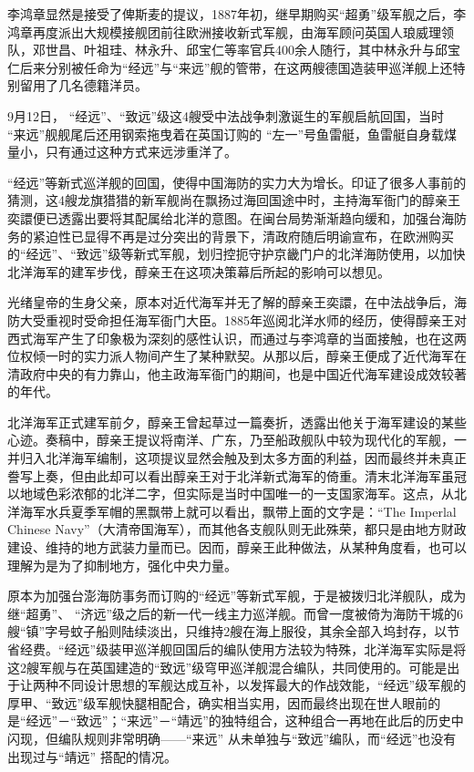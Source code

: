 \documentclass[12pt,UTF8]{ctexbook}
\begin{document}
李鸿章显然是接受了俾斯麦的提议，1887年初，继早期购买“超勇”级军舰之后，李鸿章再度派出大规模接舰团前往欧洲接收新式军舰，由海军顾问英国人琅威理领队，邓世昌、叶祖珪、林永升、邱宝仁等率官兵400余人随行，其中林永升与邱宝仁后来分别被任命为“经远”与“来远”舰的管带，在这两艘德国造装甲巡洋舰上还特别留用了几名德籍洋员。

9月12日， “经远”、“致远”级这4艘受中法战争刺激诞生的军舰启航回国，当时 “来远”舰舰尾后还用钢索拖曳着在英国订购的 “左一”号鱼雷艇，鱼雷艇自身载煤量小，只有通过这种方式来远涉重洋了。

“经远”等新式巡洋舰的回国，使得中国海防的实力大为增长。印证了很多人事前的猜测，这4艘龙旗猎猎的新军舰尚在飘扬过海回国途中时，主持海军衙门的醇亲王奕譞便已透露出要将其配属给北洋的意图。在闽台局势渐渐趋向缓和，加强台海防务的紧迫性已显得不再是过分突出的背景下，清政府随后明谕宣布，在欧洲购买的“经远”、“致远”级等新式军舰，划归控扼守护京畿门户的北洋海防使用，以加快北洋海军的建军步伐，醇亲王在这项决策幕后所起的影响可以想见。

光绪皇帝的生身父亲，原本对近代海军并无了解的醇亲王奕譞，在中法战争后，海防大受重视时受命担任海军衙门大臣。1885年巡阅北洋水师的经历，使得醇亲王对西式海军产生了印象极为深刻的感性认识，而通过与李鸿章的当面接触，也在这两位权倾一时的实力派人物间产生了某种默契。从那以后，醇亲王便成了近代海军在清政府中央的有力靠山，他主政海军衙门的期间，也是中国近代海军建设成效较著的年代。

北洋海军正式建军前夕，醇亲王曾起草过一篇奏折，透露出他关于海军建设的某些心迹。奏稿中，醇亲王提议将南洋、广东，乃至船政舰队中较为现代化的军舰，一并归入北洋海军编制，这项提议显然会触及到太多方面的利益，因而最终并未真正誊写上奏，但由此却可以看出醇亲王对于北洋新式海军的倚重。清末北洋海军虽冠以地域色彩浓郁的北洋二字，但实际是当时中国唯一的一支国家海军。这点，从北洋海军水兵夏季军帽的黑飘带上就可以看出，飘带上面的文字是：“The Imperlal Chinese Navy”（大清帝国海军），而其他各支舰队则无此殊荣，都只是由地方财政建设、维持的地方武装力量而已。因而，醇亲王此种做法，从某种角度看，也可以理解为是为了抑制地方，强化中央力量。

原本为加强台澎海防事务而订购的“经远”等新式军舰，于是被拨归北洋舰队，成为继“超勇”、 “济远”级之后的新一代一线主力巡洋舰。而曾一度被倚为海防干城的6艘“镇”字号蚊子船则陆续淡出，只维持2艘在海上服役，其余全部入坞封存，以节省经费。“经远”级装甲巡洋舰回国后的编队使用方法较为特殊，北洋海军实际是将这2艘军舰与在英国建造的“致远”级穹甲巡洋舰混合编队，共同使用的。可能是出于让两种不同设计思想的军舰达成互补，以发挥最大的作战效能，“经远”级军舰的厚甲、“致远”级军舰快腿相配合，确实相当实用，因而最终出现在世人眼前的是“经远”－“致远”；“来远”－“靖远”的独特组合，这种组合一再地在此后的历史中闪现，但编队规则非常明确——“来远” 从未单独与“致远”编队，而“经远”也没有出现过与“靖远” 搭配的情况。
\end{document}
